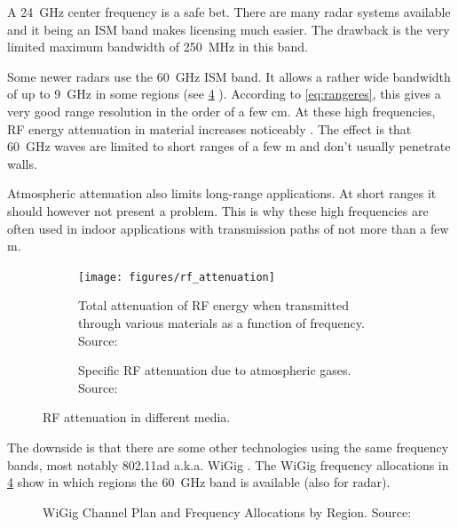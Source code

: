 A \SI{24}{GHz} center frequency is a safe bet. There are many radar
systems available and it being an ISM band makes licensing much easier.
The drawback is the very limited maximum bandwidth of \SI{250}{MHz} in this
band.

Some newer radars use the \SI{60}{GHz} ISM band. It allows a rather wide
bandwidth of up to \SI{9}{GHz} in some regions (see \cref{fig:wigig} ).
According to \cref{eq:rangeres}, this gives a very good range resolution in
the order of a few \si{cm}. At these high frequencies, RF energy
attenuation in material increases noticeably \cite{FerrisJr.1998}. The
effect is that \SI{60}{GHz} waves are limited to short ranges of a few
\si{m} and don't usually penetrate walls.

Atmospheric attenuation also limits long-range applications. At short
ranges it should however not present a problem. This is why
these high frequencies are often used in indoor applications with transmission paths of not more than a few \si{m}.

\begin{figure}[htbp]
    \centering
    \begin{subfigure}[b]{0.475\textwidth}
        \texttt{[image: figures/rf\_attenuation]}
        \caption{\label{fig:attenuation}Total attenuation of RF energy when transmitted through various materials as a function of frequency. Source: \cite{FerrisJr.1998}}
    \end{subfigure}
    \hfill
    \begin{subfigure}[b]{0.475\textwidth}
        \def\svgwidth{\linewidth} \footnotesize
        
        \caption{\label{fig:attenuation_air}Specific RF attenuation due to atmospheric gases. Source: \cite{ITU1997}\bigskip}
    \end{subfigure}
    \caption{RF attenuation in different media.}
\end{figure}

The downside is that there are some other technologies using the same
frequency bands, most notably 802.11ad a.k.a.
WiGig \cite{AgilentTechnologies2013}. The WiGig frequency allocations in
\cref{fig:wigig} show in which regions the \SI{60}{GHz} band is available (also
for radar).

\begin{figure}[htbp]
    \centering
    \def\svgwidth{\linewidth}
    
    \caption{\label{fig:wigig}WiGig Channel Plan and Frequency Allocations by Region. Source: \cite{AgilentTechnologies2013}}
\end{figure}

